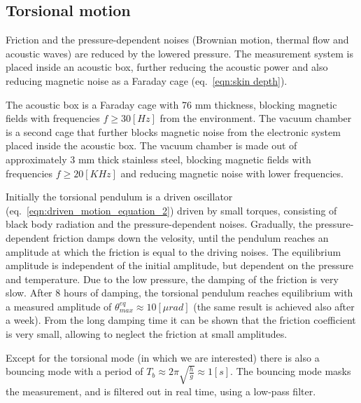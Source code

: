 \documentclass[\main/master.tex]{subfiles}
\begin{document}
\subsection{Torsional motion}
Friction and the pressure-dependent noises (Brownian motion, thermal flow and acoustic waves) are reduced by the lowered pressure. The measurement system is placed inside an acoustic box, further reducing the acoustic power and also reducing magnetic noise as a Faraday cage (eq.~\ref{eqn:skin depth}). 
\par\noindent
The acoustic box is a Faraday cage with 76 mm thickness, blocking magnetic fields with frequencies $f \ge 30 [Hz]$ from the environment. The vacuum chamber is a second cage that further blocks magnetic noise from the electronic system placed inside the acoustic box. The vacuum chamber is made out of approximately 3 mm thick stainless steel, blocking magnetic fields with frequencies $f\ge 20 [KHz]$ and reducing magnetic noise with lower frequencies.
\par\noindent
Initially the torsional pendulum is a driven oscillator (eq.~\ref{eqn:driven_motion_equation_2}) driven by small torques, consisting of black body radiation and the pressure-dependent noises. Gradually, the pressure-dependent friction damps down the velosity, until the pendulum reaches an amplitude at which the friction is equal to the driving noises. The equilibrium amplitude is independent of the initial amplitude, but dependent on the pressure and temperature. Due to the low pressure, the damping of the friction is very slow. After 8 hours of damping, the torsional pendulum reaches equilibrium with a measured amplitude of $\theta_{max}^{eq}\approx 10 [\mu rad]$ (the same result is achieved also after a week). From the long damping time it can be shown that the friction coefficient is very small, allowing to neglect the friction at small amplitudes.
\par\noindent
Except for the torsional mode (in which we are interested) there is also a bouncing mode with a period of $T_b\approx 2\pi\sqrt{\frac{h}{g}}\approx 1[s]$. The bouncing mode masks the measurement, and is filtered out in real time, using a low-pass filter.  
\par\noindent
\end{document}
